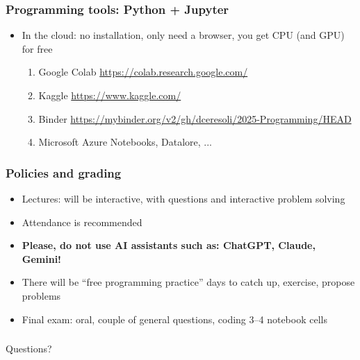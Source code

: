 \documentclass[handout]{beamer}
\begin{document}
\begin{frame}[fragile]
  \frametitle{Programming tools: Python + Jupyter}
  \begin{itemize}
  \item In the cloud: no installation, only need a browser, you get CPU (and GPU) for free
    \begin{enumerate}
        \item Google Colab \url{https://colab.research.google.com/}
        \item Kaggle \url{https://www.kaggle.com/}
        \item Binder \url{https://mybinder.org/v2/gh/dceresoli/2025-Programming/HEAD}
        \item Microsoft Azure Notebooks, Datalore, ...
    \end{enumerate}
  \end{itemize}
\end{frame} 

\begin{frame}[fragile]
  \frametitle{Policies and grading}
  \begin{itemize}
  \item Lectures: will be interactive, with questions and interactive problem solving\pause
  \item Attendance is recommended\pause
  \item \textbf{Please, do not use AI assistants such as: ChatGPT, Claude, Gemini!}\pause
  \item There will be ``free programming practice'' days to catch up, exercise, propose problems\pause
  \item Final exam: oral, couple of general questions, coding 3--4 notebook cells 
  \end{itemize}
\end{frame}

\begin{frame}
   \frametitle{}
   \begin{center}
   Questions?
   \end{center}
\end{frame}

\end{document}

